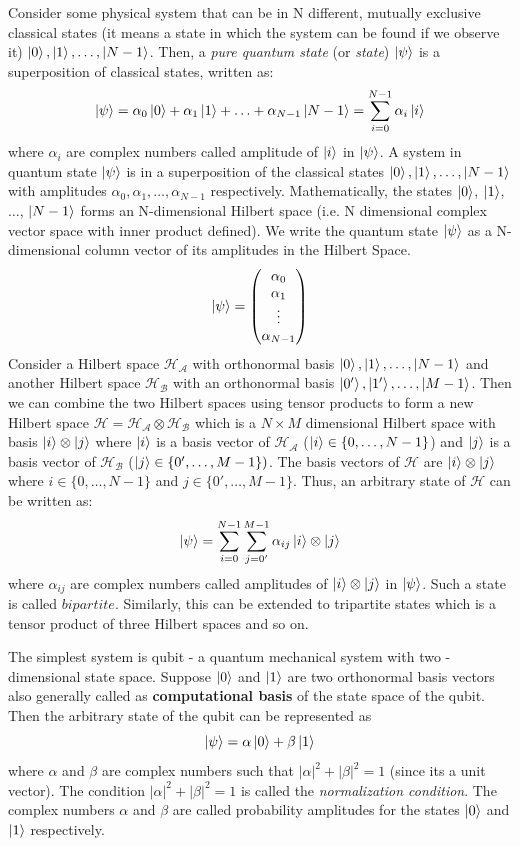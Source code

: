 Consider some physical system that can be in N different, mutually exclusive classical states (it means a state in which the system can be found 
if we observe it) $\ket{0},\ket{1},\ldots,\ket{N-1}$. Then, a \textit{pure quantum state} (or \textit{state}) $\ket{\psi}$ is a superposition of classical states, written as:
\[
    \ket{\psi}=\alpha_0\ket{0}+\alpha_1\ket{1}+\ldots+\alpha_{N-1}\ket{N-1} = \sum_{i=0}^{N-1}\alpha_i\ket{i}
\]
where $\alpha_i$ are complex numbers called amplitude of $\ket{i}$ in $\ket{\psi}$. A system in quantum state
$\ket{\psi}$ is in a superposition of the classical states $\ket{0},\ket{1},\ldots,\ket{N-1}$ with amplitudes $\alpha_0,\alpha_1,\ldots,\alpha_{N-1}$ respectively.
Mathematically, the states $\ket{0}$, $\ket{1}$, $\ldots$, $\ket{N-1}$ forms an N-dimensional Hilbert space (i.e. N dimensional complex vector space with inner product defined).
We write the quantum state $\ket{\psi}$ as a N-dimensional column vector of its amplitudes in the Hilbert Space.
\[ 
    \ket{\psi}=\begin{pmatrix} \alpha_0 \\ \alpha_1 \\ \vdots \\ \alpha_{N-1} \end{pmatrix}
\]
Consider a Hilbert space $\mathcal{H_A}$ with orthonormal basis $\ket{0},\ket{1},\ldots,\ket{N-1}$
and another Hilbert space $\mathcal{H_B}$ with an orthonormal basis $\ket{0'},\ket{1'},\ldots,\ket{M-1}$. Then we can
combine the two Hilbert spaces using tensor products to form a new Hilbert space $\mathcal{H}=\mathcal{H_A}\otimes\mathcal{H_B}$ which
is a $N\times M$ dimensional Hilbert space with basis $\ket{i}\otimes\ket{j}$ where $\ket{i}$ is a basis vector of $\mathcal{H_A}$ ($\ket{i} \in \{0,\ldots,N-1\}$) 
and $\ket{j}$ is a basis vector of $\mathcal{H_B}$ ($\ket{j} \in \{0',\ldots,M-1\})$. The basis vectors of $\mathcal{H}$ are $\ket{i}\otimes\ket{j}$ where $i \in \{0,\ldots,N-1\}$ and $j \in \{0',\ldots,M-1\}$.
Thus, an arbitrary state of $\mathcal{H}$ can be written as:
\[
    \ket{\psi}=\sum_{i=0}^{N-1}\sum_{j=0'}^{M-1}\alpha_{ij}\ket{i}\otimes\ket{j}
\]
where $\alpha_{ij}$ are complex numbers called amplitudes of $\ket{i}\otimes\ket{j}$ in $\ket{\psi}$.
Such a state is called $\mathit{bipartite}$. Similarly, this can be extended to tripartite states which is a tensor product of three Hilbert spaces and so on.

The simplest system is qubit - a quantum mechanical system with two - dimensional state space. Suppose $\ket{0}$ and $\ket{1}$ are two orthonormal basis vectors also generally called as \textbf{computational basis} of the state space of the qubit. Then the arbitrary state of the qubit can be represented as
\[
    \ket{\psi}=\alpha\ket{0}+\beta\ket{1}
\]
where $\alpha$ and $\beta$ are complex numbers such that $|\alpha|^2+|\beta|^2=1$ (since its a unit vector). The condition 
$|\alpha|^2+|\beta|^2=1$ is called the \textit{normalization condition}. The complex numbers $\alpha$ and $\beta$ are called probability amplitudes
for the states $\ket{0}$ and $\ket{1}$ respectively.

